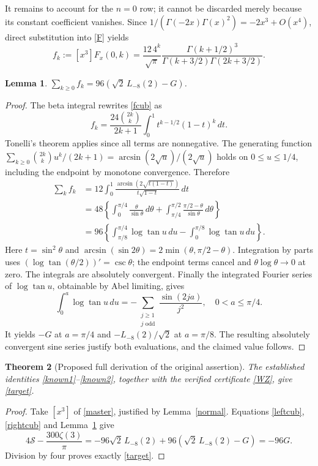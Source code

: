 \documentclass[11pt,a4paper]{article}
\newtheorem{theorem}{Theorem}[section]\newtheorem{lemma}[theorem]{Lemma}
\newcommand{\Li}{L_{-8}(2)}\newcommand{\hh}{H^{(3)}}
\begin{document}
It remains to account for the $n=0$ row; it cannot be discarded merely
because its constant coefficient vanishes. Since
$1/(\Gamma(-2x)\Gamma(x)^2)=-2x^3+O(x^4)$, direct substitution into
\eqref{F} yields
\begin{equation}\label{fcub}
 f_k:=[x^3]F_x(0,k)=\frac{12\,4^k}{\sqrt\pi}
 \frac{\Gamma(k+1/2)^3}{\Gamma(k+3/2)\Gamma(2k+3/2)}.
\end{equation}
\begin{lemma}\label{elementary}
$\displaystyle\sum_{k\ge0}f_k=96(\sqrt2\,\Li-G)$.
\end{lemma}
\begin{proof}
The beta integral rewrites \eqref{fcub} as
\[
 f_k=\frac{24\binom{2k}{k}}{2k+1}
       \int_0^1t^{k-1/2}(1-t)^k\,dt.
\]
Tonelli's theorem applies since all terms are nonnegative. The generating
function $\sum_{k\ge0}\binom{2k}{k}u^k/(2k+1)
=\arcsin(2\sqrt u)/(2\sqrt u)$ holds on $0\le u\le1/4$, including the
endpoint by monotone convergence. Therefore
\begin{align*}
 \sum_kf_k
 &=12\int_0^1\frac{\arcsin(2\sqrt{t(1-t)})}{t\sqrt{1-t}}\,dt\\
 &=48\left\{\int_0^{\pi/4}\frac{\theta}{\sin\theta}\,d\theta
 +\int_{\pi/4}^{\pi/2}\frac{\pi/2-\theta}{\sin\theta}\,d\theta\right\}\\
 &=96\left\{\int_{\pi/8}^{\pi/4}\log\tan u\,du
                  -\int_0^{\pi/8}\log\tan u\,du\right\}.
\end{align*}
Here $t=\sin^2\theta$ and
$\arcsin(\sin2\theta)=2\min(\theta,\pi/2-\theta)$.
Integration by parts uses $(\log\tan(\theta/2))'=\csc\theta$;
the endpoint terms cancel and $\theta\log\theta\to0$ at zero.
The integrals are absolutely convergent. Finally the integrated Fourier
series of $\log\tan u$, obtainable by Abel limiting, gives
\[
 \int_0^a\log\tan u\,du=-\sum_{\substack{j\ge1\\j\text{ odd}}}
                   \frac{\sin(2ja)}{j^2},\quad 0<a\le\pi/4.
\]
It yields $-G$ at $a=\pi/4$ and $-\Li/\sqrt2$ at $a=\pi/8$.
The resulting absolutely convergent sine series justify both evaluations,
and the claimed value follows.
\end{proof}

\begin{theorem}[Proposed full derivation of the original assertion]
The established identities \eqref{known1}--\eqref{known2}, together with
the verified certificate \eqref{WZ}, give \eqref{target}.
\end{theorem}
\begin{proof}
Take $[x^3]$ of \eqref{master}, justified by Lemma~\ref{normal}.
Equations \eqref{leftcub}, \eqref{rightcub} and Lemma~\ref{elementary} give
\[
 4\mathcal S-\frac{300\zeta(3)}\pi
 =-96\sqrt2\,\Li+96(\sqrt2\,\Li-G)=-96G.
\]
Division by four proves exactly \eqref{target}.
\end{proof}
\end{document}

